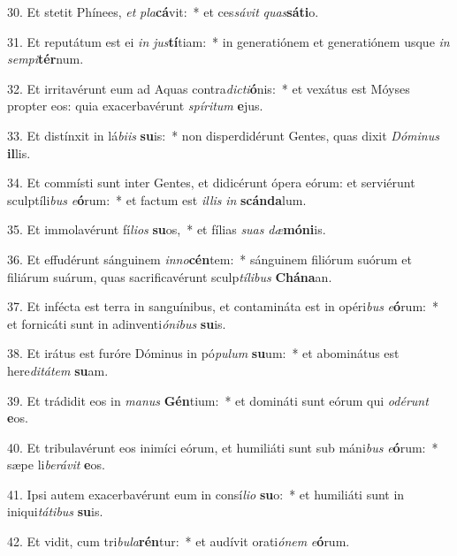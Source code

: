 30. Et stetit Phínees, \textit{et} \textit{pla}\textbf{cá}vit:~*  et ces\textit{sá}\textit{vit} \textit{quas}\textbf{sá}\textbf{ti}o.\

31. Et reputátum est ei \textit{in} \textit{jus}\textbf{tí}tiam:~*  in generatiónem et generatiónem usque \textit{in} \textit{sem}\textit{pi}\textbf{tér}num.\

32. Et irritavérunt eum ad Aquas contra\textit{dic}\textit{ti}\textbf{ó}nis:~*  et vexátus est Móyses propter eos: quia exacerbavérunt \textit{spí}\textit{ri}\textit{tum} \textbf{e}jus.\

33. Et distínxit in lá\textit{bi}\textit{is} \textbf{su}is:~*  non disperdidérunt Gentes, quas dixit \textit{Dó}\textit{mi}\textit{nus} \textbf{il}lis.\

34. Et commísti sunt inter Gentes, et didicérunt ópera eórum: et serviérunt sculptíli\textit{bus} \textit{e}\textbf{ó}rum:~*  et factum est \textit{il}\textit{lis} \textit{in} \textbf{scán}\textbf{da}lum.\

35. Et immolavérunt fí\textit{li}\textit{os} \textbf{su}os,~*  et fílias \textit{su}\textit{as} \textit{dæ}\textbf{mó}\textbf{ni}is.\

36. Et effudérunt sánguinem \textit{in}\textit{no}\textbf{cén}tem:~*  sánguinem filiórum suórum et filiárum suárum, quas sacrificavérunt sculp\textit{tí}\textit{li}\textit{bus} \textbf{Chá}\textbf{na}an.\

37. Et infécta est terra in sanguínibus, et contamináta est in opéri\textit{bus} \textit{e}\textbf{ó}rum:~*  et fornicáti sunt in adinventi\textit{ó}\textit{ni}\textit{bus} \textbf{su}is.\

38. Et irátus est furóre Dóminus in pó\textit{pu}\textit{lum} \textbf{su}um:~*  et abominátus est here\textit{di}\textit{tá}\textit{tem} \textbf{su}am.\

39. Et trádidit eos in \textit{ma}\textit{nus} \textbf{Gén}tium:~*  et domináti sunt eórum qui \textit{o}\textit{dé}\textit{runt} \textbf{e}os.\

40. Et tribulavérunt eos inimíci eórum, et humiliáti sunt sub máni\textit{bus} \textit{e}\textbf{ó}rum:~*  sæpe li\textit{be}\textit{rá}\textit{vit} \textbf{e}os.\

41. Ipsi autem exacerbavérunt eum in consí\textit{li}\textit{o} \textbf{su}o:~*  et humiliáti sunt in iniqui\textit{tá}\textit{ti}\textit{bus} \textbf{su}is.\

42. Et vidit, cum tri\textit{bu}\textit{la}\textbf{rén}tur:~*  et audívit orati\textit{ó}\textit{nem} \textit{e}\textbf{ó}rum.\

